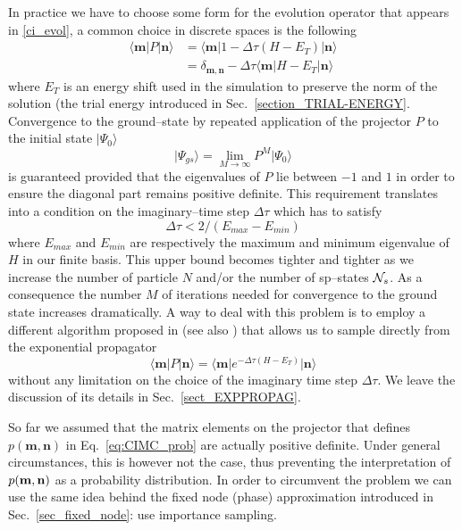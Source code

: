 In practice we have to choose some form for the evolution operator that appears in \eqref{ci_evol}, a common choice in discrete spaces is the following
\begin{equation}
\begin{split}
\label{eq:prop}
\langle \mathbf{m} \lvert P \rvert \mathbf{n} \rangle & = \langle \mathbf{m} \lvert 1 - \Delta\tau \left( H - E_T \right) \rvert \mathbf{n} \rangle \\
& = \delta_{\mathbf{m},\mathbf{n}} - \Delta\tau \langle \mathbf{m} \lvert H - E_T \rvert \mathbf{n} \rangle
\end{split}
\end{equation}
where $E_T$ is an energy shift used in the simulation to preserve the norm of the solution (the trial energy introduced in Sec.~\ref{section_TRIAL-ENERGY}. 
Convergence to the ground--state by repeated application of the projector $P$ to the initial state $\rvert \Psi_0 \rangle$
\begin{equation}
\vert\Psi_{gs}\rangle = \lim_{M \to \infty} P^M \vert \Psi_0 \rangle
\end{equation}
is guaranteed provided that the eigenvalues of $P$ lie between $-1$ and $1$ in order to ensure the diagonal part remains positive definite.
This requirement translates into a condition on the imaginary--time step $\Delta\tau$ which has to satisfy
\begin{equation}
\label{eq_bound_on_tau}
\Delta\tau < 2/(E_{max}-E_{min}) 
\end{equation}
where $E_{max}$ and $E_{min}$ are respectively the maximum and minimum eigenvalue of $H$ in our finite basis. This upper bound becomes 
tighter and tighter as we increase the number of particle $N$ and/or the number of sp--states ${\cal N}_s$. As a consequence the number $M$ of 
iterations needed for convergence to the ground state increases dramatically. A way to deal with this problem is to
employ a different algorithm proposed in \cite{Trivedi1990} (see also \cite{TenHaaf1995,Sorella2000} )
that allows us to sample directly from the exponential propagator
\begin{equation}
\langle \mathbf{m} \lvert P \rvert \mathbf{n} \rangle = \langle \mathbf{m} \lvert e^{-\Delta\tau(H-E_T)} \rvert \mathbf{n} \rangle
\end{equation}
without any limitation on the choice of the imaginary time step $\Delta \tau$. We leave the discussion of its details in Sec.~\ref{sect_EXPPROPAG}.

So far we assumed that the matrix elements on the projector that defines $p(\mathbf{m},\mathbf{n})$ in Eq.~\eqref{eq:CIMC_prob} are
actually positive definite. Under general circumstances, this is however not the case, thus preventing the interpretation 
of $p({\bf m},{\bf n})$ as a probability distribution. In order to circumvent the problem we can use the same idea behind the
fixed node (phase) approximation introduced in Sec.~\ref{sec_fixed_node}: use importance sampling.

